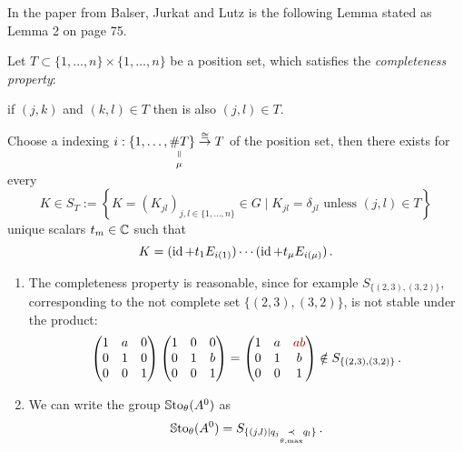 In the paper \cite{BJL1979Birkhoff} from Balser, Jurkat and Lutz is the
following Lemma stated as Lemma 2 on page 75.
\begin{lem}
  Let $T\subset\{1,\dots,n\}\times\{1,\dots,n\}$ be a position set, which
  satisfies the \emph{completeness property}:
  \begin{einr}
    if $(j,k)$ and $(k,l)\in T$ then is also $(j,l)\in T$.
  \end{einr}
  Choose a indexing $i:\{1,\dots,
  \underset{\mu}{\underset{\text{\rotatebox[origin=c]{-90}{$=$}}}{\#T}}\}
  \overset{\cong}{\to}T$ of the position set, then there exists for every 
  \[
    K\in S_T:=\left\{K=(K_{jl})_{j,l\in\{1,\dots,n\}}\in G \mid
      K_{jl}=\delta_{jl} \text{~unless~} (j,l)\in T \right\}
  \]
  unique scalars $t_m\in\mathbb{C}$ such that
  \[
    K=(\operatorname{id} + t_1E_{i(1)})\cdots(\operatorname{id} + t_{\mu}E_{i(\mu)}) \,.
  \]
  \begin{s-rem}
    \begin{enumerate}
      \item The completeness property is reasonable, since for example
        $S_{\{(2,3),(3,2)\}}$, corresponding to the not complete set
        $\{(2,3),(3,2)\}$, is not stable under the product:
        \begin{align*}
          \begin{pmatrix}
            1 & a & 0
          \\0 & 1 & 0
          \\0 & 0 & 1
          \end{pmatrix}
          \begin{pmatrix}
            1 & 0 & 0
          \\0 & 1 & b
          \\0 & 0 & 1
          \end{pmatrix}
          =
          \begin{pmatrix}
            1 & a & \textcolor{red!60!black}{ab}
          \\0 & 1 & b
          \\0 & 0 & 1
          \end{pmatrix}
          \notin S_{\{(2,3),(3,2)\}}
          \,.
        \end{align*}
      \item We can write the group $\operatorname{\mathbb{S}to}_\theta(A^0)$ as 
        \[
          \operatorname{\mathbb{S}to}_\theta(A^0)=
          S_{\{(j,l)\mid q_j \underset{\theta,\max}{\prec} q_l\}} \,.
        \]
    \end{enumerate}
  \end{s-rem}
\end{lem}
